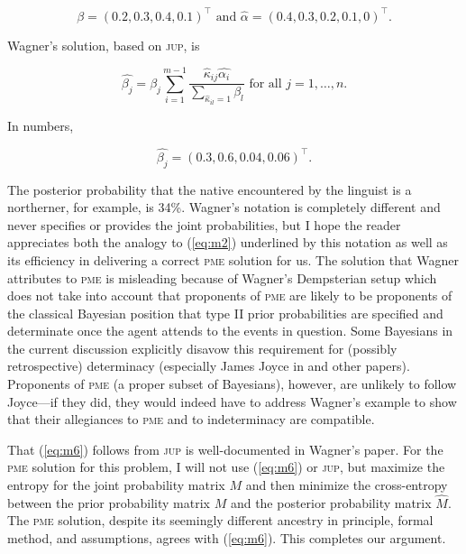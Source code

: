 \documentclass[entropy,article,accept,oneauthor,pdftex,12pt,a4paper]{mdpi}
\begin{document}
\begin{equation}
  \label{eq:m5}
  \beta=(0.2,0.3,0.4,0.1)^{\top}\mbox{ and }\hat{\alpha}=(0.4,0.3,0.2,0.1,0)^{\top}.
\end{equation}

Wagner's solution, based on \textsc{jup}, is

\begin{equation}
  \label{eq:m6}
  \hat{\beta_{j}}=\beta_{j}\sum_{i=1}^{m-1}\frac{\hat{\kappa}_{ij}\hat{\alpha_{i}}}{\sum_{\hat{\kappa}_{il}=1}\beta_{l}}\mbox{ for all }j=1,\ldots,n.
\end{equation}

{\noindent}In numbers,

\begin{equation}
  \label{eq:m7}
  \hat{\beta_{j}}=(0.3,0.6,0.04,0.06)^{\top}.
\end{equation}

{\noindent}The posterior probability that the native encountered by
the linguist is a northerner, for example, is 34\%. Wagner's notation
is completely different and never specifies or provides the joint
probabilities, but I hope the reader appreciates both the analogy to
(\ref{eq:m2}) underlined by this notation as well as its efficiency in
delivering a correct \textsc{pme} solution for us. The solution that
Wagner attributes to \textsc{pme} is misleading because of Wagner's
Dempsterian setup which does not take into account that proponents of
\textsc{pme} are likely to be proponents of the classical Bayesian
position that type II prior probabilities are specified and
determinate once the agent attends to the events in question. Some
Bayesians in the current discussion explicitly disavow this
requirement for (possibly retrospective) determinacy (especially James
Joyce in \cite{ref-14} and other papers). Proponents of \textsc{pme} (a proper
subset of Bayesians), however, are unlikely to follow Joyce---if they
did, they would indeed have to address Wagner's example to show
that their allegiances to \textsc{pme} and to indeterminacy are
compatible. 

That (\ref{eq:m6}) follows from \textsc{jup} is well-documented in
Wagner's paper. For the \textsc{pme} solution for this problem, I
will not use (\ref{eq:m6}) or \textsc{jup}, but maximize the entropy
for the joint probability matrix $M$ and then minimize the
cross-entropy between the prior probability matrix $M$ and the
posterior probability matrix $\hat{M}$. The \textsc{pme} solution,
despite its seemingly different ancestry in principle, formal method,
and assumptions, agrees with (\ref{eq:m6}). This completes our
argument.
\end{document}
